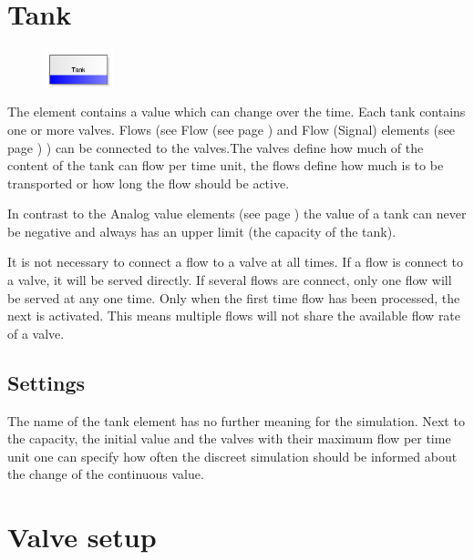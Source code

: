 \section{Tank}
\label{ref:ModelElementTank}

\begin{figure}
\vspace{-22pt}
\includegraphics[width=2cm]{imageModelElementTank.png}
\vspace{-22pt}
\end{figure}

The element contains a value which can change over the time.
Each tank contains one or more valves. Flows (see Flow (see page \pageref{ref:ModelElementTankFlowByClient}) 
and Flow (Signal) elements (see page \pageref{ref:ModelElementTankFlowBySignal}) )
can be connected to the valves.The valves define how much of the content of the tank
can flow per time unit, the flows define how much is to be transported or how long
the flow should be active.

In contrast to the Analog value elements (see page \pageref{ref:ModelElementAnalogValue}) 
the value of a tank can never be negative and always has an upper limit (the capacity of the tank).

It is not necessary to connect a flow to a valve at all times.
If a flow is connect to a valve, it will be served directly.
If several flows are connect, only one flow will be served at any one time.
Only when the first time flow has been processed, the next is activated.
This means multiple flows will not share the available flow rate of a valve.

\subsection*{Settings}

The name of the tank element has no further meaning for the simulation.
Next to the capacity, the initial value and the valves with their maximum flow per time unit
one can specify how often the discreet simulation should be informed about the change of
the continuous value.


\section{Valve setup}
\label{ref:ModelElementTankValveSetup}

